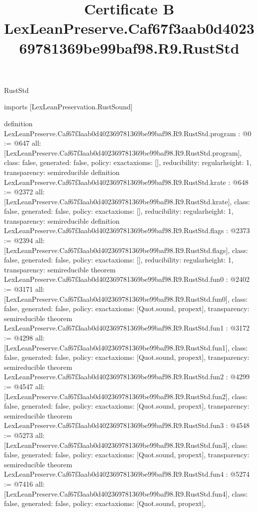\begin{lexlean}{RustStd}
\title{Certificate B LexLeanPreserve.Caf67f3aab0d402369781369be99baf98.R9.RustStd}
\begin{coremodule}
imports [LexLeanPreservation.RustSound]

definition LexLeanPreserve.Caf67f3aab0d402369781369be99baf98.R9.RustStd.program : @0 := @647 {
  all: [LexLeanPreserve.Caf67f3aab0d402369781369be99baf98.R9.RustStd.program],
  class: false,
  generated: false,
  policy: exact{axioms: []},
  reducibility: regular{height: 1},
  transparency: semireducible
}
definition LexLeanPreserve.Caf67f3aab0d402369781369be99baf98.R9.RustStd.krate : @648 := @2372 {
  all: [LexLeanPreserve.Caf67f3aab0d402369781369be99baf98.R9.RustStd.krate],
  class: false,
  generated: false,
  policy: exact{axioms: []},
  reducibility: regular{height: 1},
  transparency: semireducible
}
definition LexLeanPreserve.Caf67f3aab0d402369781369be99baf98.R9.RustStd.flags : @2373 := @2394 {
  all: [LexLeanPreserve.Caf67f3aab0d402369781369be99baf98.R9.RustStd.flags],
  class: false,
  generated: false,
  policy: exact{axioms: []},
  reducibility: regular{height: 1},
  transparency: semireducible
}
theorem LexLeanPreserve.Caf67f3aab0d402369781369be99baf98.R9.RustStd.fun0 : @2402 := @3171 {
  all: [LexLeanPreserve.Caf67f3aab0d402369781369be99baf98.R9.RustStd.fun0],
  class: false,
  generated: false,
  policy: exact{axioms: [Quot.sound, propext]},
  transparency: semireducible
}
theorem LexLeanPreserve.Caf67f3aab0d402369781369be99baf98.R9.RustStd.fun1 : @3172 := @4298 {
  all: [LexLeanPreserve.Caf67f3aab0d402369781369be99baf98.R9.RustStd.fun1],
  class: false,
  generated: false,
  policy: exact{axioms: [Quot.sound, propext]},
  transparency: semireducible
}
theorem LexLeanPreserve.Caf67f3aab0d402369781369be99baf98.R9.RustStd.fun2 : @4299 := @4547 {
  all: [LexLeanPreserve.Caf67f3aab0d402369781369be99baf98.R9.RustStd.fun2],
  class: false,
  generated: false,
  policy: exact{axioms: [Quot.sound, propext]},
  transparency: semireducible
}
theorem LexLeanPreserve.Caf67f3aab0d402369781369be99baf98.R9.RustStd.fun3 : @4548 := @5273 {
  all: [LexLeanPreserve.Caf67f3aab0d402369781369be99baf98.R9.RustStd.fun3],
  class: false,
  generated: false,
  policy: exact{axioms: [Quot.sound, propext]},
  transparency: semireducible
}
theorem LexLeanPreserve.Caf67f3aab0d402369781369be99baf98.R9.RustStd.fun4 : @5274 := @7416 {
  all: [LexLeanPreserve.Caf67f3aab0d402369781369be99baf98.R9.RustStd.fun4],
  class: false,
  generated: false,
  policy: exact{axioms: [Quot.sound, propext]},
}
\end{coremodule}
\end{lexlean}
